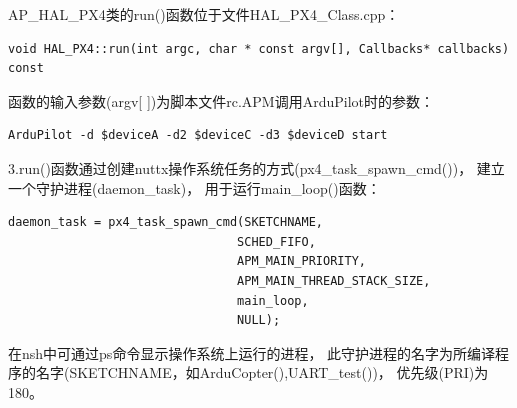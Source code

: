\documentclass[a4paper,10pt]{ctexart} %
\begin{document}
AP\_HAL\_PX4类的run()函数位于文件HAL\_PX4\_Class.cpp：
\begin{lstlisting}
void HAL_PX4::run(int argc, char * const argv[], Callbacks* callbacks) const
\end{lstlisting}
函数的输入参数(argv[ ])为脚本文件rc.APM调用ArduPilot时的参数：
\begin{lstlisting}
ArduPilot -d $deviceA -d2 $deviceC -d3 $deviceD start
\end{lstlisting}

3.run()函数通过创建nuttx操作系统任务的方式(px4\_task\_spawn\_cmd())，
建立一个守护进程(daemon\_task)，
用于运行main\_loop()函数：
\begin{lstlisting}
daemon_task = px4_task_spawn_cmd(SKETCHNAME,
                                SCHED_FIFO,
                                APM_MAIN_PRIORITY,
                                APM_MAIN_THREAD_STACK_SIZE,
                                main_loop,
                                NULL);
\end{lstlisting}
在nsh中可通过ps命令显示操作系统上运行的进程，
此守护进程的名字为所编译程序的名字(SKETCHNAME，如ArduCopter(),UART\_test())，
优先级(PRI)为180。
\end{document}
